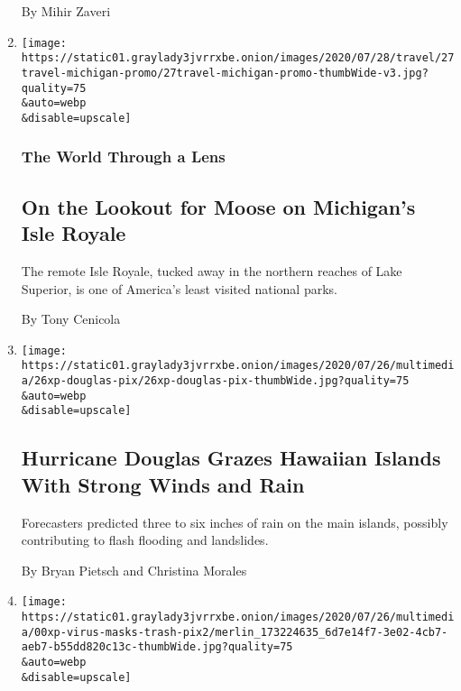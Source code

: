 \begin{enumerate}
  By Mihir Zaveri
\item
  \href{/2020/07/27/travel/moose-michigan-isle-royale.html}{}

  \texttt{[image: https://static01.graylady3jvrrxbe.onion/images/2020/07/28/travel/27travel-michigan-promo/27travel-michigan-promo-thumbWide-v3.jpg?quality=75\\\&auto=webp\\\&disable=upscale]}

  \hypertarget{the-world-through-a-lens}{%
  \subsubsection{The World Through a
  Lens}\label{the-world-through-a-lens}}

  \hypertarget{on-the-lookout-for-moose-on-michigans-isle-royale}{%
  \subsection{On the Lookout for Moose on Michigan's Isle
  Royale}\label{on-the-lookout-for-moose-on-michigans-isle-royale}}

  The remote Isle Royale, tucked away in the northern reaches of Lake
  Superior, is one of America's least visited national parks.

  By Tony Cenicola
\item
  \href{/2020/07/26/us/hurricane-douglas-hawaii.html}{}

  \texttt{[image: https://static01.graylady3jvrrxbe.onion/images/2020/07/26/multimedia/26xp-douglas-pix/26xp-douglas-pix-thumbWide.jpg?quality=75\\\&auto=webp\\\&disable=upscale]}

  \hypertarget{hurricane-douglas-grazes-hawaiian-islands-with-strong-winds-and-rain}{%
  \subsection{Hurricane Douglas Grazes Hawaiian Islands With Strong
  Winds and
  Rain}\label{hurricane-douglas-grazes-hawaiian-islands-with-strong-winds-and-rain}}

  Forecasters predicted three to six inches of rain on the main islands,
  possibly contributing to flash flooding and landslides.

  By Bryan Pietsch and Christina Morales
\item
  \href{/2020/07/25/climate/covid-masks-discarded.html}{}

  \texttt{[image: https://static01.graylady3jvrrxbe.onion/images/2020/07/26/multimedia/00xp-virus-masks-trash-pix2/merlin\_173224635\_6d7e14f7-3e02-4cb7-aeb7-b55dd820c13c-thumbWide.jpg?quality=75\\\&auto=webp\\\&disable=upscale]}


\end{enumerate}
